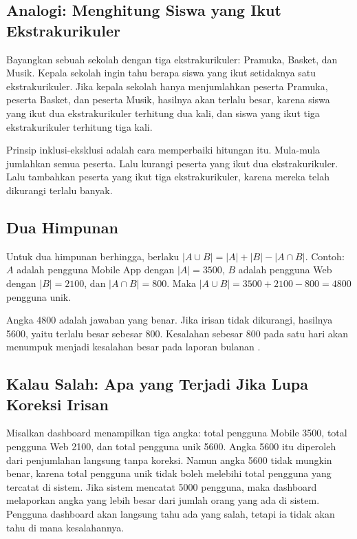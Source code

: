 \documentclass[11pt,a4paper]{article}
\begin{document}
\subsection{Analogi: Menghitung Siswa yang Ikut Ekstrakurikuler}

Bayangkan sebuah sekolah dengan tiga ekstrakurikuler: Pramuka, Basket, dan Musik. Kepala sekolah ingin tahu berapa siswa yang ikut setidaknya satu ekstrakurikuler. Jika kepala sekolah hanya menjumlahkan peserta Pramuka, peserta Basket, dan peserta Musik, hasilnya akan terlalu besar, karena siswa yang ikut dua ekstrakurikuler terhitung dua kali, dan siswa yang ikut tiga ekstrakurikuler terhitung tiga kali.

Prinsip inklusi-eksklusi adalah cara memperbaiki hitungan itu. Mula-mula jumlahkan semua peserta. Lalu kurangi peserta yang ikut dua ekstrakurikuler. Lalu tambahkan peserta yang ikut tiga ekstrakurikuler, karena mereka telah dikurangi terlalu banyak.

\subsection{Dua Himpunan}

Untuk dua himpunan berhingga, berlaku $|A \cup B|=|A|+|B|-|A \cap B|$. Contoh: $A$ adalah pengguna Mobile App dengan $|A|=3500$, $B$ adalah pengguna Web dengan $|B|=2100$, dan $|A \cap B|=800$. Maka $|A \cup B|=3500+2100-800=4800$ pengguna unik.

Angka 4800 adalah jawaban yang benar. Jika irisan tidak dikurangi, hasilnya 5600, yaitu terlalu besar sebesar 800. Kesalahan sebesar 800 pada satu hari akan menumpuk menjadi kesalahan besar pada laporan bulanan \cite{rosen}.

\subsection{Kalau Salah: Apa yang Terjadi Jika Lupa Koreksi Irisan}

Misalkan dashboard menampilkan tiga angka: total pengguna Mobile 3500, total pengguna Web 2100, dan total pengguna unik 5600. Angka 5600 itu diperoleh dari penjumlahan langsung tanpa koreksi. Namun angka 5600 tidak mungkin benar, karena total pengguna unik tidak boleh melebihi total pengguna yang tercatat di sistem. Jika sistem mencatat 5000 pengguna, maka dashboard melaporkan angka yang lebih besar dari jumlah orang yang ada di sistem. Pengguna dashboard akan langsung tahu ada yang salah, tetapi ia tidak akan tahu di mana kesalahannya.
\end{document}
